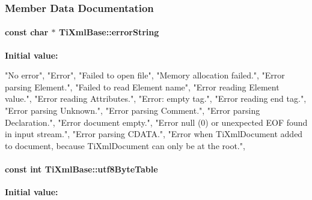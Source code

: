 \subsubsection{Member Data Documentation}
\hypertarget{class_ti_xml_base_a7ac8feec4100e446b3d78e1ac0659700}{
\paragraph[{errorString}]{\setlength{\rightskip}{0pt plus 5cm}const char $\ast$ TiXmlBase::errorString}\hfill}
\label{class_ti_xml_base_a7ac8feec4100e446b3d78e1ac0659700}
{\bfseries Initial value:}
\begin{DoxyCode}

{
  "No error",
  "Error",
  "Failed to open file",
  "Memory allocation failed.",
  "Error parsing Element.",
  "Failed to read Element name",
  "Error reading Element value.",
  "Error reading Attributes.",
  "Error: empty tag.",
  "Error reading end tag.",
  "Error parsing Unknown.",
  "Error parsing Comment.",
  "Error parsing Declaration.",
  "Error document empty.",
  "Error null (0) or unexpected EOF found in input stream.",
  "Error parsing CDATA.",
  "Error when TiXmlDocument added to document, because TiXmlDocument can only be 
      at the root.",
}
\end{DoxyCode}
\hypertarget{class_ti_xml_base_ac8c86058137bdb4b413c3eca58f2d467}{
\paragraph[{utf8ByteTable}]{\setlength{\rightskip}{0pt plus 5cm}const int TiXmlBase::utf8ByteTable}\hfill}
\label{class_ti_xml_base_ac8c86058137bdb4b413c3eca58f2d467}
{\bfseries Initial value:}
